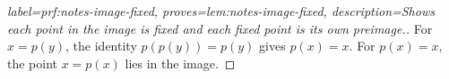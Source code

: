 \begingroup
{}
\begin{proof}[
  label={prf:notes-image-fixed},
  proves={lem:notes-image-fixed},
  description={Shows each point in the image is fixed and each fixed point is its own preimage.}
]
For $x=p(y)$, the identity $p(p(y))=p(y)$ gives $p(x)=x$.
For $p(x)=x$, the point $x=p(x)$ lies in the image.
\end{proof}

\endgroup
